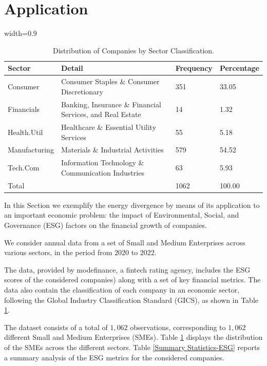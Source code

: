 \documentclass{article}
\begin{document}
\section{Application}


\label{sec:examples}

\begin{table}[t]
    \centering
    \begin{adjustbox}{width=0.9\textwidth}
    \footnotesize
    \begin{tabular}{llll}
        \toprule
        Sector & Detail & Frequency & Percentage \\ 
\midrule
        Consumer & Consumer Staples \& Consumer Discretionary & 351 & 33.05 \\ 
        Financials & Banking, Insurance \& Financial Services, and Real Estate & 14 & 1.32 \\ 
        Health.Util & Healthcare \& Essential Utility Services & 55 & 5.18 \\  
        Manufacturing & Materials \& Industrial Activities & 579 & 54.52 \\
        Tech.Com & Information Technology \& Communication Industries & 63 & 5.93 \\ 
        \midrule
        Total & & 1062 & 100.00 \\
        \bottomrule
    \end{tabular}
    \end{adjustbox}
    \caption{Distribution of Companies by Sector Classification.}
    \label{Sector-Classification}
\end{table}
%

	
In this Section we exemplify the  energy divergence by means of its application to an important economic problem: the impact of Environmental, Social, and Governance (ESG) factors on the financial growth of companies.
% 

We consider annual data from a set of Small and Medium Enterprises across various sectors, in the period from $2020$ to $2022$.
 
% 
The data, provided by modefinance, a fintech rating agency, includes the ESG scores of the considered companies) along with a set of key financial metrics.  
The data also contain the classification of each company in an economic sector, following the Global Industry Classification Standard (GICS), as shown in Table \ref{Sector-Classification}. 


The dataset consists of a total of $1,062$ observations, corresponding to  $1,062$ different Small and Medium Enterprises (SMEs).
 Table \ref{Sector-Classification} displays the distribution of the SMEs across the different sectors. 
% 
% 
 Table \ref{Summary Statistics-ESG} reports a summary analysis of the ESG metrics for the considered companies.
% 
\end{document}
